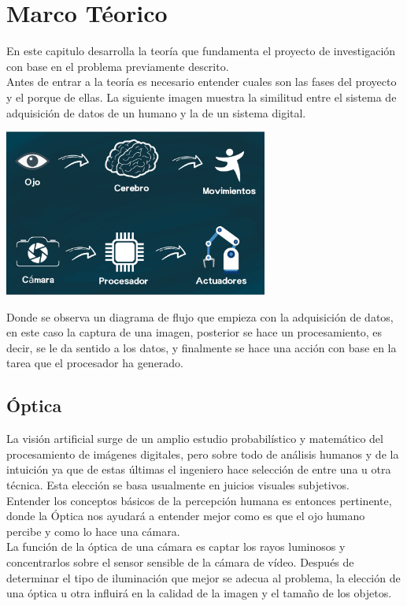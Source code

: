 \chapter{Marco Téorico}
En este capitulo desarrolla la teoría que fundamenta el proyecto de investigación con base
en el problema previamente descrito.\\
Antes de entrar a la teoría es necesario entender cuales son las fases del proyecto y
el porque de ellas.
La siguiente imagen muestra la similitud entre el sistema de adquisición de datos
de un humano y la de un sistema digital.
\begin{center}
    \includegraphics[width=0.65\textwidth]{Capitulo2/Fig1.eps}
    \label{Fig1}
\end{center}
Donde se observa un diagrama de flujo que empieza con la adquisición de datos, en este
caso la captura de una imagen, posterior se hace un procesamiento, es decir, se le da
sentido a los datos, y finalmente se hace una acción con base en la tarea que el procesador
ha generado.


\section{Óptica}
La visión artificial surge de un amplio estudio probabilístico y matemático del
procesamiento de imágenes digitales, pero sobre todo de análisis humanos y de la
intuición ya que de estas últimas el ingeniero hace selección de entre una u otra
técnica. Esta elección se basa usualmente en juicios visuales subjetivos.\\
Entender los conceptos básicos de la percepción humana es entonces pertinente, donde
la Óptica nos ayudará a entender mejor como es que el ojo humano percibe y como lo
hace una cámara. \\
La función de la óptica de una cámara es captar los rayos luminosos y concentrarlos
sobre el sensor sensible de la cámara de vídeo. Después de determinar el tipo de
iluminación que mejor se adecua al problema, la elección de una óptica u otra influirá
en la calidad de la imagen y el tamaño de los objetos.

